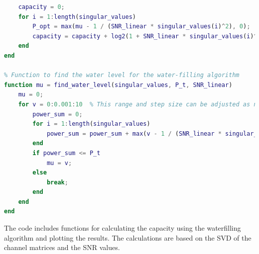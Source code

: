 \documentclass[lettersize,journal]{IEEEtran}
\begin{document}
\begin{lstlisting}[language=Matlab]
    % Calculating capacity with allocated power
    capacity = 0;
    for i = 1:length(singular_values)
        P_opt = max(mu - 1 / (SNR_linear * singular_values(i)^2), 0);
        capacity = capacity + log2(1 + SNR_linear * singular_values(i)^2 * P_opt);
    end
end

% Function to find the water level for the water-filling algorithm
function mu = find_water_level(singular_values, P_t, SNR_linear)
    mu = 0;
    for v = 0:0.001:10  % This range and step size can be adjusted as needed
        power_sum = 0;
        for i = 1:length(singular_values)
            power_sum = power_sum + max(v - 1 / (SNR_linear * singular_values(i)^2), 0);
        end
        if power_sum <= P_t
            mu = v;
        else
            break;
        end
    end
end

\end{lstlisting}

The code includes functions for calculating the capacity using the waterfilling algorithm and plotting the results. The calculations are based on the SVD of the channel matrices and the SNR values.



\end{document}
